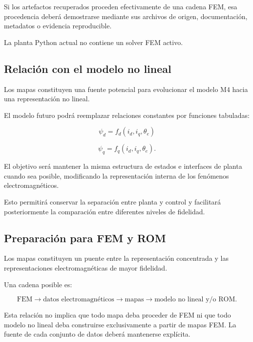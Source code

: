 Si los artefactos recuperados proceden efectivamente de una cadena FEM, esa procedencia deberá demostrarse mediante sus archivos de origen, documentación, metadatos o evidencia reproducible.

La planta Python actual no contiene un solver FEM activo.

\subsection{Relación con el modelo no lineal}

Los mapas constituyen una fuente potencial para evolucionar el modelo M4 hacia una representación no lineal.

El modelo futuro podrá reemplazar relaciones constantes por funciones tabuladas:

\begin{equation}
\psi_d=f_d(i_d,i_q,\theta_e)
\end{equation}

\begin{equation}
\psi_q=f_q(i_d,i_q,\theta_e).
\end{equation}

El objetivo será mantener la misma estructura de estados e interfaces de planta cuando sea posible, modificando la representación interna de los fenómenos electromagnéticos.

Esto permitirá conservar la separación entre planta y control y facilitará posteriormente la comparación entre diferentes niveles de fidelidad.

\subsection{Preparación para FEM y ROM}

Los mapas constituyen un puente entre la representación concentrada y las representaciones electromagnéticas de mayor fidelidad.

Una cadena posible es:

\begin{equation}
\mathrm{FEM}
\rightarrow
\text{datos electromagnéticos}
\rightarrow
\text{mapas}
\rightarrow
\text{modelo no lineal y/o ROM}.
\end{equation}

Esta relación no implica que todo mapa deba proceder de FEM ni que todo modelo no lineal deba construirse exclusivamente a partir de mapas FEM. La fuente de cada conjunto de datos deberá mantenerse explícita.

